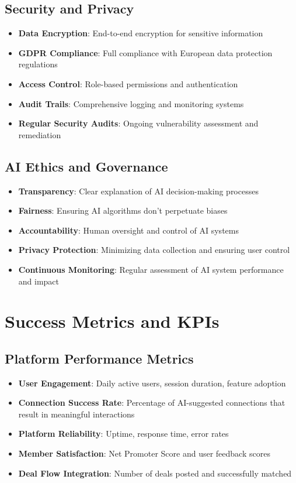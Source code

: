 \subsection{Security and Privacy}
\begin{itemize}
    \item \textbf{Data Encryption}: End-to-end encryption for sensitive information
    \item \textbf{GDPR Compliance}: Full compliance with European data protection regulations
    \item \textbf{Access Control}: Role-based permissions and authentication
    \item \textbf{Audit Trails}: Comprehensive logging and monitoring systems
    \item \textbf{Regular Security Audits}: Ongoing vulnerability assessment and remediation
\end{itemize}

\subsection{AI Ethics and Governance}
\begin{itemize}
    \item \textbf{Transparency}: Clear explanation of AI decision-making processes
    \item \textbf{Fairness}: Ensuring AI algorithms don't perpetuate biases
    \item \textbf{Accountability}: Human oversight and control of AI systems
    \item \textbf{Privacy Protection}: Minimizing data collection and ensuring user control
    \item \textbf{Continuous Monitoring}: Regular assessment of AI system performance and impact
\end{itemize}

\section{Success Metrics and KPIs}

\subsection{Platform Performance Metrics}
\begin{itemize}
    \item \textbf{User Engagement}: Daily active users, session duration, feature adoption
    \item \textbf{Connection Success Rate}: Percentage of AI-suggested connections that result in meaningful interactions
    \item \textbf{Platform Reliability}: Uptime, response time, error rates
    \item \textbf{Member Satisfaction}: Net Promoter Score and user feedback scores
    \item \textbf{Deal Flow Integration}: Number of deals posted and successfully matched
\end{itemize}

